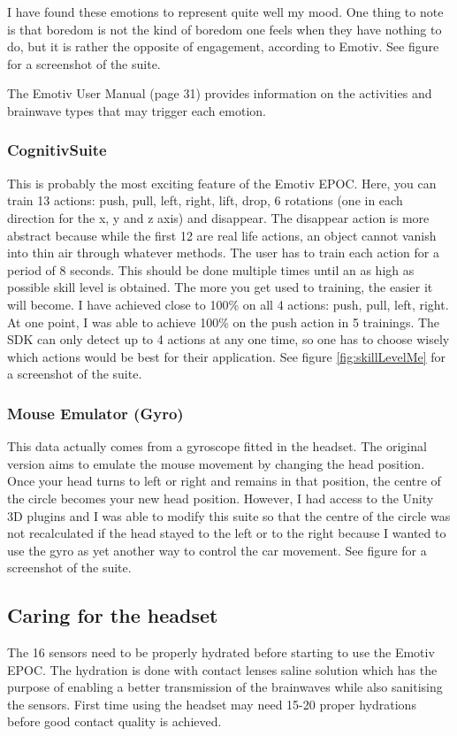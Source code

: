I have found these emotions to represent quite well my mood. One thing to note is that boredom is not the kind of boredom one feels when they have nothing to do, but it is rather the opposite of engagement, according to Emotiv. See figure for a screenshot of the suite.

The Emotiv User Manual \cite{emotivUserManual} (page 31) provides information on the activities and brainwave types that may trigger each emotion.

\subsubsection{Cognitiv\texttrademark  Suite}
This is probably the most exciting feature of the Emotiv EPOC. Here, you can train 13 actions: push, pull, left, right, lift, drop, 6 rotations (one in each direction for the x, y and z axis) and disappear. The disappear action is more abstract because while the first 12 are real life actions, an object cannot vanish into thin air through whatever methods. The user has to train each action for a period of 8 seconds. This should be done multiple times until an as high as possible skill level is obtained. The more you get used to training, the easier it will become. I have achieved close to 100\% on all 4 actions: push, pull, left, right. At one point, I was able to achieve 100\% on the push action in 5 trainings. The SDK can only detect up to 4 actions at any one time, so one has to choose wisely which actions would be best for their application. See figure \ref{fig:skillLevelMe} for a screenshot of the suite.

\subsubsection{Mouse Emulator (Gyro)}

This data actually comes from a gyroscope fitted in the headset. The original version aims to emulate the mouse movement by changing the head position. Once your head turns to left or right and remains in that position, the centre of the circle becomes your new head position. However, I had access to the Unity 3D plugins and I was able to modify this suite so that the centre of the circle was not recalculated if the head stayed to the left or to the right because I wanted to use the gyro as yet another way to control the car movement. See figure for a screenshot of the suite.

\subsection{Caring for the headset}
The 16 sensors need to be properly hydrated before starting to use the Emotiv EPOC. The hydration is done with contact lenses saline solution which has the purpose of enabling a better transmission of the brainwaves while also sanitising the sensors. First time using the headset may need 15-20 proper hydrations before good contact quality is achieved.

